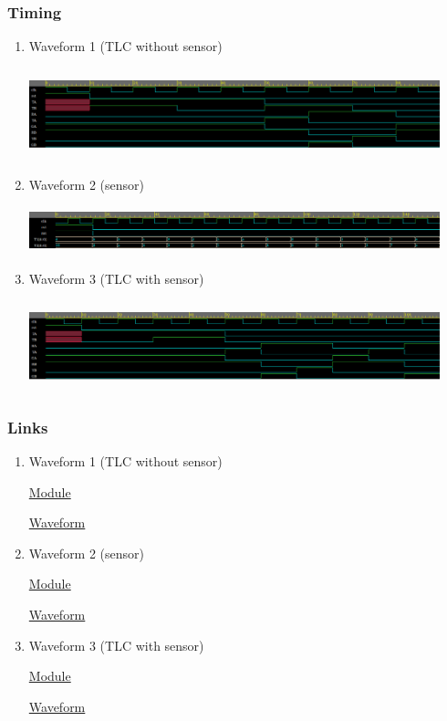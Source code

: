 \documentclass[11pt]{article}
\begin{document}
\subsubsection{Timing}
\label{sec:org372f3f0}
\begin{enumerate}
\item Waveform 1 (TLC without sensor)
\label{sec:org359ab5f}
\begin{center}
\includegraphics[width=450px,height=100px]{./assets/TLC_waveform1.png}
\end{center}
\item Waveform 2 (sensor)
\label{sec:org83f15f0}
\begin{center}
\includegraphics[width=450px,height=50px]{./assets/TLC_waveform2.png}
\end{center}
\item Waveform 3 (TLC with sensor)
\label{sec:orga86ff46}
\begin{center}
\includegraphics[width=450px,height=100px]{./assets/TLC_waveform3.png}
\end{center}
\end{enumerate}
\subsubsection{Links}
\label{sec:org713b439}
\begin{enumerate}
\item Waveform 1 (TLC without sensor)
\label{sec:org919006c}

\href{https://www.edaplayground.com/x/3qgC}{Module}

\href{https://www.edaplayground.com/w/x/2yK}{Waveform}
\item Waveform 2 (sensor)
\label{sec:org558a90a}

\href{https://www.edaplayground.com/x/4vEy}{Module}

\href{https://www.edaplayground.com/w/x/3tx}{Waveform}
\item Waveform 3 (TLC with sensor)
\label{sec:orgb32e684}

\href{https://www.edaplayground.com/x/ie6}{Module}

\href{https://www.edaplayground.com/w/x/cy}{Waveform}
\end{enumerate}
\end{document}
